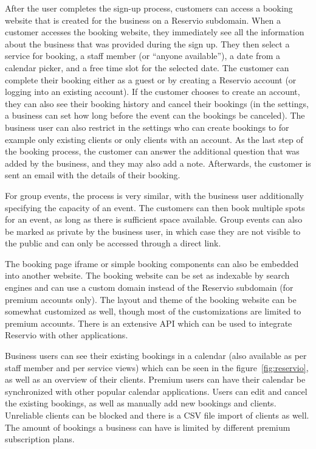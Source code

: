 After the user completes the sign-up process, customers can access a booking website that is created for the business on a Reservio subdomain. When a customer accesses the booking website, they immediately see all the information about the business that was provided during the sign up. They then select a service for booking, a staff member (or \enquote{anyone available}), a date from a calendar picker, and a free time slot for the selected date. The customer can complete their booking either as a guest or by creating a Reservio account (or logging into an existing account). If the customer chooses to create an account, they can also see their booking history and cancel their bookings (in the settings, a business can set how long before the event can the bookings be canceled). The business user can also restrict in the settings who can create bookings to for example only existing clients or only clients with an account. As the last step of the booking process, the customer can answer the additional question that was added by the business, and they may also add a note. Afterwards, the customer is sent an email with the details of their booking.

For group events, the process is very similar, with the business user additionally specifying the capacity of an event. The customers can then book multiple spots for an event, as long as there is sufficient space available. Group events can also be marked as private by the business user, in which case they are not visible to the public and can only be accessed through a direct link.

The booking page iframe or simple booking components can also be embedded into another website. The booking website can be set as indexable by search engines and can use a custom domain instead of the Reservio subdomain (for premium accounts only). The layout and theme of the booking website can be somewhat customized as well, though most of the customizations are limited to premium accounts. There is an extensive API which can be used to integrate Reservio with other applications.

Business users can see their existing bookings in a calendar (also available as per staff member and per service views) which can be seen in the figure~\ref{fig:reservio}, as well as an overview of their clients. Premium users can have their calendar be synchronized with other popular calendar applications. Users can edit and cancel the existing bookings, as well as manually add new bookings and clients. Unreliable clients can be blocked and there is a CSV file import of clients as well. The amount of bookings a business can have is limited by different premium subscription plans.

